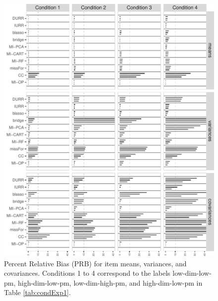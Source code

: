 \begin{figure}
\centering
\includegraphics{../../output/graphs/exp1_bias_summy.pdf}
\caption{\label{fig:exp1bias}
	Percent Relative Bias (PRB) for item means, variances, and covariances.
	Conditions 1 to 4 correspond to the labels low-dim-low-pm, high-dim-low-pm, low-dim-high-pm, and 
	high-dim-low-pm in Table \ref{tab:condExp1}.
	}
\end{figure}

